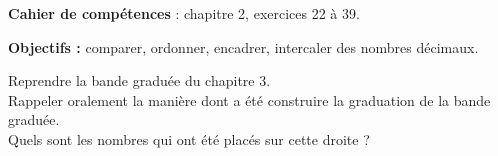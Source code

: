 \vfill

\textcolor{PartieGeometrie}{\large\sffamily\bfseries Cahier de compétences} : chapitre 2, exercices 22 à 39.


\activites

\begin{activite}
   {\bf Objectifs :} comparer, ordonner, encadrer, intercaler des nombres décimaux.
   \begin{QCM}
      \partie[réinvestissement]
         Reprendre la bande graduée du chapitre 3. \\
         Rappeler oralement la manière dont a été construire la graduation de la bande graduée. \\
         Quels sont les nombres qui ont été placés sur cette droite ? \\ [3mm]
         \pf \\ [5mm]
         \pf \\
         
      

\end{QCM}
\end{activite}
